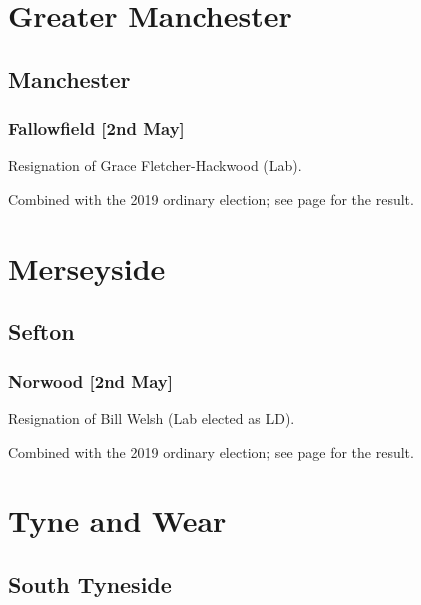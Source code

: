 \documentclass[a4paper,openany]{book}
\begin{document}
\begin{resultsiii}
\section{Greater Manchester}

\subsection*{Manchester}

\subsubsection*{Fallowfield \hspace*{\fill}\nolinebreak[1]%
	\enspace\hspace*{\fill}
	[2nd May]}


Resignation of Grace Fletcher-Hackwood (Lab).

Combined with the 2019 ordinary election; see page \pageref{ManchesterFallowfield} for the result.

\section{Merseyside}

\subsection*{Sefton}

\subsubsection*{Norwood \hspace*{\fill}\nolinebreak[1]%
	\enspace\hspace*{\fill}
	[2nd May]}


Resignation of Bill Welsh (Lab elected as LD).

Combined with the 2019 ordinary election; see page \pageref{SeftonNorwood} for the result.

\section{Tyne and Wear}

\subsection*{South Tyneside}


\end{resultsiii}
\end{document}
